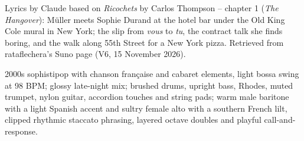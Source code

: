 
\begin{notes}
Lyrics by Claude based on \emph{Ricochets} by Carlos Thompson -- chapter 1 (\emph{The Hangover}): Müller meets Sophie Durand at the hotel bar under the Old King Cole mural in New York; the slip from \emph{vous} to \emph{tu}, the contract talk she finds boring, and the walk along 55th Street for a New York pizza. Retrieved from rataflechera's Suno page (V6, 15 November 2026).
\end{notes}
\begin{style}
2000s sophistipop with chanson française and cabaret elements, light bossa swing at 98 BPM; glossy late-night mix; brushed drums, upright bass, Rhodes, muted trumpet, nylon guitar, accordion touches and string pads; warm male baritone with a light Spanish accent and sultry female alto with a southern French lilt, clipped rhythmic staccato phrasing, layered octave doubles and playful call-and-response.
\end{style}
